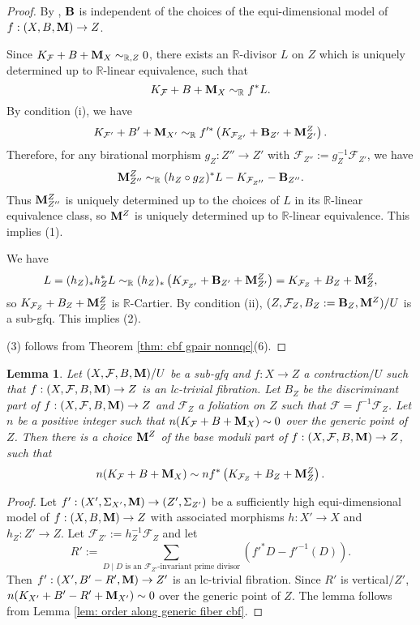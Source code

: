 \documentclass[11pt]{amsart}
\numberwithin{equation}{section}
\newcommand{\Mm}{{\bf{M}}}
\newcommand{\Rr}{\mathbb{R}}
\newcommand{\Bb}{{\bf{B}}}
\newcommand{\Ff}{\mathcal{F}}
\newtheorem{lem}[thm]{Lemma}
\theoremstyle{definition}
\theoremstyle{definition}
\theoremstyle{definition}
\begin{document}
\begin{proof}
By \cite[Definition-Lemma 6.11]{LLM23}, $\Bb$ is independent of the choices of the equi-dimensional model of $f: (X,B,\Mm)\rightarrow Z$. 

Since $K_{\Ff}+B+\Mm_X\sim_{\mathbb R,Z}0$, there exists an $\Rr$-divisor $L$ on $Z$ which is uniquely determined up to $\Rr$-linear equivalence, such that
$$K_{\Ff}+B+\Mm_X\sim_{\mathbb R}f^*L.$$
By condition (i), we have
$$K_{\Ff'}+B'+\Mm_{X'}\sim_{\mathbb R}f'^*\left(K_{\Ff_{Z'}}+\Bb_{Z'}+\Mm^Z_{Z'}\right).$$
Therefore, for any birational morphism $g_Z: Z''\rightarrow Z'$ with $\Ff_{Z''}:=g_Z^{-1}\Ff_{Z'}$, we have
$$\Mm^Z_{Z''}\sim_{\mathbb R}(h_Z\circ g_Z)^*L-K_{\Ff_{Z''}}-\Bb_{Z''}.$$
Thus $\Mm^Z_{Z''}$ is uniquely determined up to the choices of $L$ in its $\Rr$-linear equivalence class, so $\Mm^Z$ is uniquely determined up to $\Rr$-linear equivalence. This implies (1).

We have
$$L=(h_Z)_*h_Z^*L\sim_{\mathbb R}(h_Z)_*\left(K_{\Ff_{Z'}}+\Bb_{Z'}+\Mm^Z_{Z'}\right)=K_{\Ff_Z}+B_Z+\Mm^Z_Z,$$
so $K_{\Ff_Z}+B_Z+\Mm^Z_Z$ is $\Rr$-Cartier. By condition (ii), $(Z,\Ff_Z,B_Z:=\Bb_Z,\Mm^Z)/U$ is a sub-gfq. This implies (2).

(3) follows from Theorem \ref{thm: cbf gpair nonnqc}(6).
\end{proof}


\begin{lem}\label{lem: order along generic fiber cbf gfq}
Let $(X,\Ff,B,\Mm)/U$ be a sub-gfq and $f: X\rightarrow Z$ a contraction$/U$ such that $f: (X,\Ff,B,\Mm)\rightarrow Z$ is an lc-trivial fibration. Let $B_Z$ be the discriminant part of $f: (X,\Ff,B,\Mm)\rightarrow Z$ and $\Ff_Z$ a foliation on $Z$ such that $\Ff=f^{-1}\Ff_Z$. Let $n$ be a positive integer such that $n(K_{\Ff}+B+\Mm_X)\sim 0$ over the generic point of $Z$. Then there is a choice $\Mm^Z$ of the base moduli part of  $f: (X,\Ff,B,\Mm)\rightarrow Z$, such that 
$$n(K_{\Ff}+B+\Mm_X)\sim nf^*\left(K_{\Ff_Z}+B_Z+\Mm^Z_Z\right).$$
\end{lem}
\begin{proof}
Let $f': (X',\Sigma_{X'},\Mm)\rightarrow (Z',\Sigma_{Z'})$ be a sufficiently high equi-dimensional model of $f: (X,B,\Mm)\rightarrow Z$ with associated morphisms $h: X'\rightarrow X$ and $h_Z: Z'\rightarrow Z$. Let $\Ff_{Z'}:=h_Z^{-1}\Ff_Z$ and let  
$$R':=\sum_{D\mid D\text{ is an }\Ff_{Z'}\text{-invariant prime divisor}}(f'^*D-f'^{-1}(D)).$$
Then $f': (X',B'-R',\Mm)\rightarrow Z'$ is an lc-trivial fibration.
Since $R'$ is vertical$/Z'$, $n(K_{X'}+B'-R'+\Mm_{X'})\sim 0$ over the generic point of $Z$. The lemma follows from Lemma \ref{lem: order along generic fiber cbf}.
\end{proof}
\end{document}
